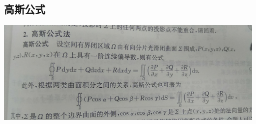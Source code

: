 \documentclass[UTF8]{ctexart}
\begin{document}
\subsection{高斯公式}
\includegraphics[width=14cm]{9345E7/IMG_20180419_111223.jpg}
\end{document}
